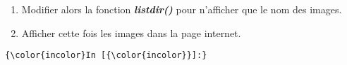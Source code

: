 \documentclass{article}
\begin{document}
\begin{enumerate}
\def\labelenumi{\arabic{enumi}.}
\setcounter{enumi}{1}
\itemsep1pt\parskip0pt
\item
  Modifier alors la fonction \textbf{\emph{listdir()}} pour n'afficher
  que le nom des images.
\item
  Afficher cette fois les images dans la page internet.
\end{enumerate}

    \begin{Verbatim}[commandchars=\\\{\}]
{\color{incolor}In [{\color{incolor}}]:} 
\end{Verbatim}


    
    
    
    
\end{document}
